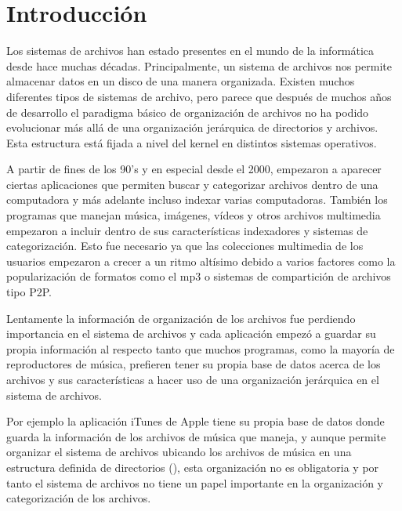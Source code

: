 \chapter{Introducción}
\ifpdf
    \graphicspath{{Introduction/IntroductionFigs/PNG/}{Introduction/IntroductionFigs/PDF/}{Introduction/IntroductionFigs/}}
\else
    \graphicspath{{Introduction/IntroductionFigs/EPS/}{Introduction/IntroductionFigs/}}
\fi

Los sistemas de archivos han estado presentes en el mundo de la informática desde hace muchas décadas. Principalmente, un sistema de archivos nos permite almacenar datos en un disco de una manera organizada. Existen muchos diferentes tipos de sistemas de archivo, pero parece que después de muchos años de desarrollo el paradigma básico de organización de archivos no ha podido evolucionar más allá de una organización jerárquica de directorios y archivos. Esta estructura está fijada a nivel del kernel en distintos sistemas operativos. 

A partir de fines de los 90's y en especial desde el 2000, empezaron a aparecer ciertas aplicaciones que permiten buscar y categorizar archivos dentro de una computadora y más adelante incluso indexar varias computadoras. También los programas que manejan música, imágenes, vídeos y otros archivos multimedia empezaron a incluir dentro de sus características indexadores y sistemas de categorización. Esto fue necesario ya que las colecciones multimedia de los usuarios empezaron a crecer a un ritmo altísimo debido a varios factores como la popularización de formatos como el mp3 o sistemas de compartición de archivos tipo P2P.

Lentamente la información de organización de los archivos fue perdiendo importancia en el sistema de archivos y cada aplicación empezó a guardar su propia información al respecto tanto que muchos programas, como la mayoría de reproductores de música, prefieren tener su propia base de datos acerca de los archivos y sus características a hacer uso de una organización jerárquica en el sistema de archivos.

Por ejemplo la aplicación iTunes de Apple tiene su propia base de datos donde guarda la información de los archivos de música que maneja, y aunque permite organizar el sistema de archivos ubicando los archivos de música en una estructura definida de directorios (), esta organización no es obligatoria y por tanto el sistema de archivos no tiene un papel importante en la organización y categorización de los archivos.

